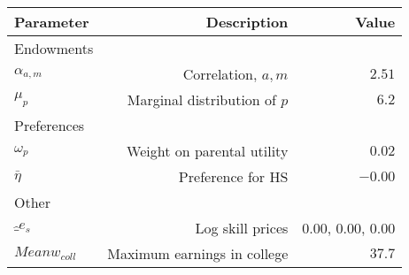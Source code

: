 \begin{tabular}{lrr}
\hline
Parameter & Description  & Value  \\
\hline
Endowments &   &   \\
$\alpha_{a,m}$ & Correlation, $a,m$  & $2.51$  \\
$\mu_{p}$ & Marginal distribution of $p$  & $6.2$  \\
Preferences &   &   \\
$\omega_{p}$ & Weight on parental utility  & $0.02$  \\
$\bar{\eta}$ & Preference for HS  & $-0.00$  \\
Other &   &   \\
$\hat_{e}_{s}$ & Log skill prices  & 0.00, 0.00, 0.00  \\
$Mean w_{coll}$ & Maximum earnings in college  & $37.7$  \\
\hline
\end{tabular}%
